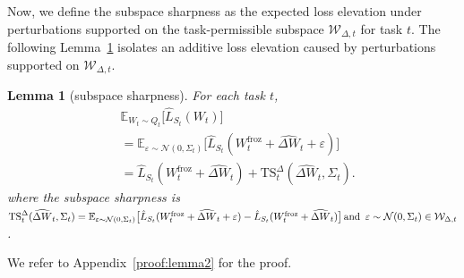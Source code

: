 \documentclass{article}
\theoremstyle{plain}
\newtheorem{lemma}[theorem]{Lemma}
\theoremstyle{definition}
\theoremstyle{remark}
\begin{document}
 
Now, we define the subspace sharpness as the expected loss elevation under perturbations supported on the task-permissible subspace $\mathcal W_{\Delta,t}$ for task $t$. The following Lemma~\ref{lem:subspace-loss-pecl} isolates an additive loss elevation caused by perturbations supported on $\mathcal W_{\Delta,t}$.

\begin{lemma}[subspace sharpness]
\label{lem:subspace-loss-pecl}
For each task $t$,
{%
\setlength{\abovedisplayskip}{1pt}
\setlength{\belowdisplayskip}{2pt}
\setlength{\abovedisplayshortskip}{1pt}
\setlength{\belowdisplayshortskip}{2pt}
\begin{equation*}
\label{eq:subspace-loss-pecl}
\begin{aligned}
&\mathbb E_{W_t\sim Q_t}\bigl[\hat L_{S_t}(W_t)\bigr] \\
&= \mathbb{E}_{\varepsilon\sim\mathcal N(0,\Sigma_t)}
    \big[\hat{L}_{S_t}(W^{\mathrm{froz}}_t+\widehat{\Delta W}_t+\varepsilon)\big] \\
& =\hat L_{S_t}(W^{\mathrm{froz}}_t + \widehat{\Delta W}_t)
+
\mathrm{TS}_t^{\Delta}(\widehat{\Delta W}_t,\Sigma_t).
\end{aligned}
\end{equation*}
}where the subspace sharpness is $
\mathrm{TS}_t^{\Delta}(\widehat{\Delta W}_t,\Sigma_t)
= \mathbb{E}_{\varepsilon\sim\mathcal N(0,\Sigma_t)}
   \big[\hat{L}_{S_t}(W^{\mathrm{froz}}_t+\widehat{\Delta W}_t+\varepsilon)
   - \hat{L}_{S_t}(W^{\mathrm{froz}}_t+\widehat{\Delta W}_t)\big] \text{\,and\, } 
     \varepsilon\sim\mathcal N(0,\Sigma_t) \in  \mathcal W_{\Delta,t}$.
     \end{lemma}

We refer to Appendix~\ref{proof:lemma2} for the proof.
\end{document}
